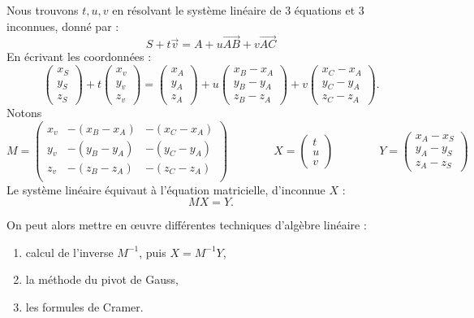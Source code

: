 \documentclass[11pt,class=report,crop=false]{standalone}
\begin{document}
Nous trouvons $t,u,v$ en résolvant le système linéaire de $3$ équations et $3$ inconnues, donné par :
$$S + t \vec v = A + u \overrightarrow{AB} + v \overrightarrow{AC}$$
En écrivant les coordonnées :
$$
\begin{pmatrix}x_S\\y_S\\z_S\end{pmatrix}
+ t \begin{pmatrix}x_v\\y_v\\z_v\end{pmatrix}
= \begin{pmatrix}x_A\\y_A\\z_A\end{pmatrix}
+ u \begin{pmatrix}x_B-x_A\\y_B-y_A\\z_B-z_A\end{pmatrix}
+ v \begin{pmatrix}x_C-x_A\\y_C-y_A\\z_C-z_A\end{pmatrix}.$$
Notons 
$$
M = 
\begin{pmatrix}
	x_v & -(x_B-x_A) & -(x_C-x_A) \\
	y_v & -(y_B-y_A) & -(y_C-y_A) \\
	z_v & -(z_B-z_A) & -(z_C-z_A) \\
\end{pmatrix}
\qquad\qquad
X = \begin{pmatrix}t\\u\\v\end{pmatrix} 
\qquad\qquad
Y = \begin{pmatrix}x_A-x_S\\y_A-y_S\\z_A-z_S\end{pmatrix}$$
Le système linéaire équivaut à l'équation matricielle, d'inconnue $X$ :
$$MX = Y.$$

On peut alors mettre en \oe uvre différentes techniques d'algèbre linéaire :
\begin{enumerate}
	\item calcul de l'inverse $M^{-1}$, puis $X = M^{-1}Y$,
	\item la méthode du pivot de Gauss,
	\item les formules de Cramer.
\end{enumerate}
\end{document}
